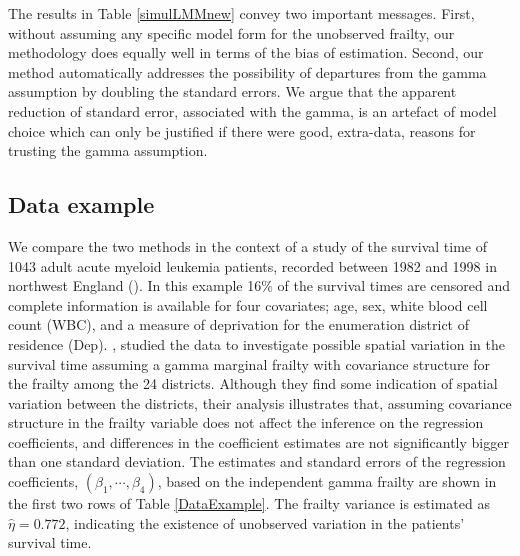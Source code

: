 \documentclass[graybox]{svmult}
\begin{document}
%

The results in Table \ref{simulLMMnew} convey two important messages. First, without assuming any  specific
model form for the unobserved frailty, our methodology does equally well in terms of the bias of estimation.
Second, our method automatically addresses the possibility of departures from the gamma assumption by 
doubling  the  standard errors. We argue that the apparent  reduction of standard error, associated with the gamma,  is an artefact of model choice which can only be justified if there were good, extra-data, reasons for trusting the gamma assumption. 

\subsection{Data example}\label{Example_survival}
We compare the two methods in the context of a study of  the survival time of 1043 adult acute myeloid leukemia patients, recorded
between 1982 and 1998 in northwest England (\cite{Henderson2002}). In this example 16\% of the survival times are censored and
complete information is available for four covariates; age, sex, white blood cell count (WBC), and a measure of
deprivation for the enumeration district of residence (Dep). \cite{Henderson2002}, studied the data to investigate possible
spatial variation in the survival time assuming a gamma marginal frailty with covariance structure for the frailty
among the 24 districts. Although they find some indication of spatial variation between the districts, their analysis
illustrates that, assuming covariance structure in the frailty variable does not affect the
inference on the regression coefficients, and differences in the coefficient estimates are not significantly bigger
than one standard deviation. The estimates and standard errors of the regression coefficients,  $(\beta_1,\cdots,\beta_4)$, based on the independent gamma frailty are shown in the first two rows of Table \ref{DataExample}. The frailty variance is estimated as $\hat{\eta}=0.772$,  indicating the
existence of unobserved variation in the patients' survival time.
\end{document}
